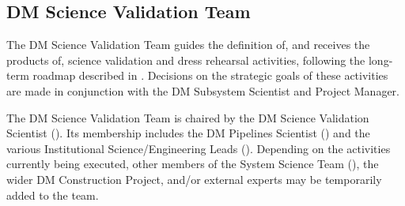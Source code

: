 \subsection{DM Science Validation Team}
\label{sect:dmsvt}

The DM Science Validation Team guides the definition of, and receives the products of, science validation and dress rehearsal activities, following the long-term roadmap described in .
Decisions on the strategic goals of these activities are made in conjunction with the DM Subsystem Scientist and Project Manager.

The DM Science Validation Team is chaired by the DM Science Validation Scientist ().
Its membership includes the DM Pipelines Scientist () and the various Institutional Science/Engineering Leads ().
Depending on the activities currently being executed, other members of the System Science Team (), the wider DM Construction Project, and/or external experts may be temporarily added to the team.
